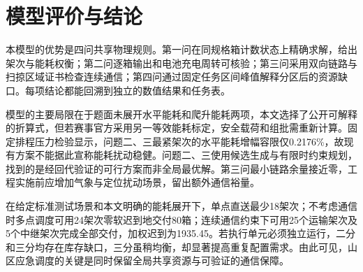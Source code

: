 \section{模型评价与结论}

本模型的优势是四问共享物理规则。第一问在同规格箱计数状态上精确求解，给出架次与能耗权衡；第二问逐箱输出和电池充电周转可核验；第三问采用双向链路与扫掠区域证书检查连续通信；第四问通过固定任务区间峰值解释分区后的资源缺口。每项结论都能回溯到独立的数值结果和任务表。

模型的主要局限在于题面未展开水平能耗和爬升能耗两项，本文选择了公开可解释的折算式，但若赛事官方采用另一等效能耗标定，安全载荷和组批需重新计算。固定排程压力检验显示，问题二、三最紧架次的水平能耗增幅容限仅0.2176\%，故现有方案不能据此宣称能耗扰动稳健。问题二、三使用候选生成与有限时约束规划，找到的是经回代验证的可行方案而非全局最优解。第三问最小链路余量接近零，工程实施前应增加气象与定位扰动场景，留出额外通信裕量。

在给定标准测试场景和本文明确的能耗展开下，单点直送最少18架次；不考虑通信时多点调度可用24架次零软迟到地交付80箱；连续通信约束下可用25个运输架次及5个中继架次完成全部交付，加权迟到为1935.45。若执行单元必须独立运行，二分和三分均存在库存缺口，三分虽稍均衡，却显著提高重复配置需求。由此可见，山区应急调度的关键是同时保留全局共享资源与可验证的通信保障。
